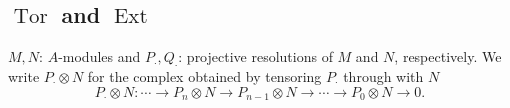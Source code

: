 \subsection{\texorpdfstring{\( \operatorname{Tor} \)}{Tor} and \texorpdfstring{\( \operatorname{Ext} \)}{Ext}}

\( M, N \): \( A \)-modules and \( P_{\cdot}, Q_{\cdot} \): projective resolutions of \( M \) and \( N \), respectively.
We write \( P_{\cdot} \otimes N \) for the complex obtained by tensoring \( P_{\cdot} \) through with \( N \)
\[
  P_{\cdot} \otimes N: \cdots \to P_n \otimes N \to P_{n - 1} \otimes N \to \cdots \to P_0 \otimes N \to 0.
\]

